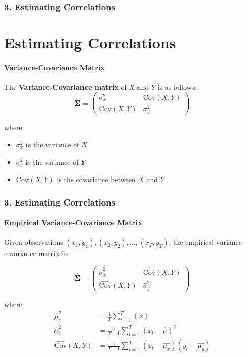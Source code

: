 \documentclass{beamer}
\begin{document}
\begin{frame}[t]
    \frametitle{3. Estimating Correlations}
    \section{Estimating Correlations}
    \framesubtitle{Variance-Covariance Matrix}

    The \textbf{Variance-Covariance matrix} of $X$ and $Y$ is as follows:
    $$\boldsymbol{\Sigma} = \begin{pmatrix}
    \sigma_x^2 & \text{Cov}(X,Y) \\
    \text{Cov}(X,Y) & \sigma_y^2
    \end{pmatrix}$$

    where:
    \begin{itemize}
        \item $\sigma_x^2$ is the variance of $X$
        \item $\sigma_y^2$ is the variance of $Y$  
        \item $\text{Cov}(X,Y)$ is the covariance between $X$ and $Y$
    \end{itemize}

\end{frame}

\begin{frame}[t]
    \frametitle{3. Estimating Correlations}
    \framesubtitle{Empirical Variance-Covariance Matrix}

    \footnotesize

    Given observations $(x_1, y_1), (x_2, y_2), \ldots, (x_T, y_T)$, the empirical variance-covariance matrix is:

    $$\hat{\boldsymbol{\Sigma}} = \begin{pmatrix}
    \hat{\sigma}_x^2 & \widehat{\text{Cov}}(X,Y) \\
    \widehat{\text{Cov}}(X,Y) & \hat{\sigma}_y^2
    \end{pmatrix}$$

    where:
    \begin{align}
    \hat{\mu}_x^2 &= \frac{1}{T}\sum_{t=1}^{T}(x)\\
    \hat{\sigma}_x^2 &= \frac{1}{T-1}\sum_{t=1}^{T}(x_t - \hat{\mu})^2\\
    \widehat{\text{Cov}}(X,Y) &= \frac{1}{T-1}\sum_{t=1}^{T}(x_t - \hat{\mu_x})(y_t - \hat{\mu_y})
    \end{align}

\end{frame}
\end{document}
